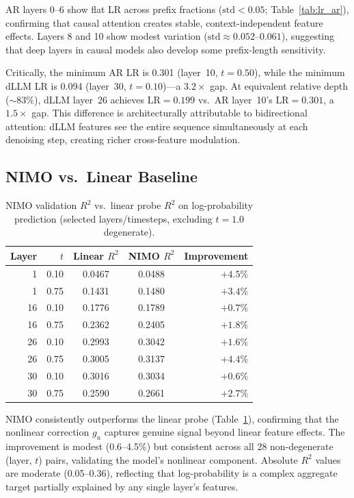 \documentclass[11pt]{article}
\newcommand{\LR}{\mathrm{LR}}
\begin{document}
AR layers 0--6 show flat LR across prefix fractions ($\mathrm{std} < 0.05$; Table~\ref{tab:lr_ar}), confirming that causal attention creates stable, context-independent feature effects.
Layers 8 and 10 show modest variation ($\mathrm{std} \approx 0.052$--$0.061$), suggesting that deep layers in causal models also develop some prefix-length sensitivity.

Critically, the minimum AR LR is 0.301 (layer~10, $t = 0.50$), while the minimum dLLM LR is 0.094 (layer~30, $t = 0.10$)---a $3.2\times$ gap. At equivalent relative depth (${\sim}83\%$), dLLM layer~26 achieves $\LR = 0.199$ vs.\ AR layer~10's $\LR = 0.301$, a $1.5\times$ gap. This difference is architecturally attributable to bidirectional attention: dLLM features see the entire sequence simultaneously at each denoising step, creating richer cross-feature modulation.

\subsection{NIMO vs.\ Linear Baseline}

\begin{table}[h]
\centering
\caption{NIMO validation $R^2$ vs.\ linear probe $R^2$ on log-probability prediction (selected layers/timesteps, excluding $t = 1.0$ degenerate).}
\label{tab:r2}
\begin{tabular}{rr cc r}
\toprule
\textbf{Layer} & $t$ & \textbf{Linear $R^2$} & \textbf{NIMO $R^2$} & \textbf{Improvement} \\
\midrule
1  & 0.10 & 0.0467 & 0.0488 & $+4.5\%$ \\
1  & 0.75 & 0.1431 & 0.1480 & $+3.4\%$ \\
16 & 0.10 & 0.1776 & 0.1789 & $+0.7\%$ \\
16 & 0.75 & 0.2362 & 0.2405 & $+1.8\%$ \\
26 & 0.10 & 0.2993 & 0.3042 & $+1.6\%$ \\
26 & 0.75 & 0.3005 & 0.3137 & $+4.4\%$ \\
30 & 0.10 & 0.3016 & 0.3034 & $+0.6\%$ \\
30 & 0.75 & 0.2590 & 0.2661 & $+2.7\%$ \\
\bottomrule
\end{tabular}
\end{table}

NIMO consistently outperforms the linear probe (Table~\ref{tab:r2}), confirming that the nonlinear correction $g_u$ captures genuine signal beyond linear feature effects.
The improvement is modest (0.6--4.5\%) but consistent across all 28 non-degenerate (layer, $t$) pairs, validating the model's nonlinear component.
Absolute $R^2$ values are moderate (0.05--0.36), reflecting that log-probability is a complex aggregate target partially explained by any single layer's features.
\end{document}
